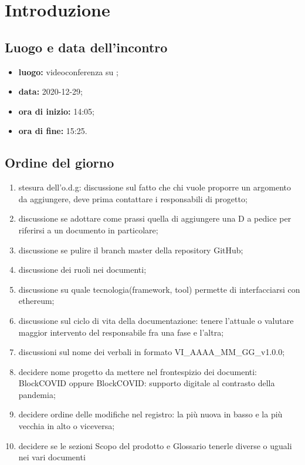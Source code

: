 \section*{Introduzione}

\subsection*{Luogo e data dell'incontro}
\begin{itemize}
	\item \textbf{luogo:} videoconferenza su ;
	\item \textbf{data:} 2020-12-29;
	\item \textbf{ora di inizio:} 14:05;
	\item \textbf{ora di fine:} 15:25.
\end{itemize}

\subsection*{Ordine del giorno}
	\begin{enumerate}
	\item stesura dell'o.d.g: discussione sul fatto che chi vuole proporre un argomento da aggiungere, deve prima contattare i responsabili di progetto;
	\item discussione se adottare come prassi quella di aggiungere una D a pedice per riferirsi a un documento in particolare;
	\item discussione se pulire il branch master della repository GitHub;
	\item discussione dei ruoli nei documenti;
	\item discussione su quale tecnologia(framework, tool) permette di interfacciarsi con ethereum;
	\item discussione sul ciclo di vita della documentazione: tenere l'attuale o valutare maggior intervento del responsabile fra una fase e l'altra;
	\item discussioni sul nome dei verbali in formato VI\_AAAA\_MM\_GG\_v1.0.0;
	\item decidere nome progetto da mettere nel frontespizio dei documenti: BlockCOVID oppure BlockCOVID: supporto digitale al contrasto della pandemia;
	\item decidere ordine delle modifiche nel registro: la più nuova in basso e la più vecchia in alto o viceversa;
	\item decidere se le sezioni Scopo del prodotto e Glossario tenerle diverse o uguali nei vari documenti

\end{enumerate}

